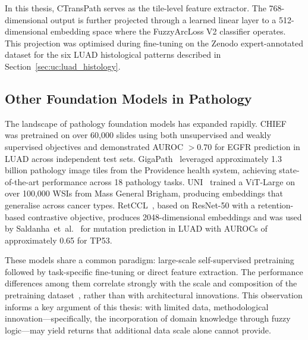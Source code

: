 In this thesis, CTransPath serves as the tile-level feature extractor.
The 768-dimensional output is further projected through a learned linear layer to a 512-dimensional embedding space where the FuzzyArcLoss V2 classifier operates.
This projection was optimised during fine-tuning on the Zenodo expert-annotated dataset for the six LUAD histological patterns described in Section~\ref{sec:uc:luad_histology}.

\subsection{Other Foundation Models in Pathology}
\label{sec:bg:foundation}

The landscape of pathology foundation models has expanded rapidly.
CHIEF~\cite{wang2024chief} was pretrained on over 60,000 slides using both unsupervised and weakly supervised objectives and demonstrated AUROC $>0.70$ for EGFR prediction in LUAD across independent test sets.
GigaPath~\cite{xu2024gigapath} leveraged approximately 1.3 billion pathology image tiles from the Providence health system, achieving state-of-the-art performance across 18 pathology tasks.
UNI~\cite{chen2024uni} trained a ViT-Large on over 100,000 WSIs from Mass General Brigham, producing embeddings that generalise across cancer types.
RetCCL~\cite{wang2023retccl}, based on ResNet-50 with a retention-based contrastive objective, produces 2048-dimensional embeddings and was used by Saldanha~et~al.~\cite{saldanha2023npj} for mutation prediction in LUAD with AUROCs of approximately 0.65 for TP53.

These models share a common paradigm: large-scale self-supervised pretraining followed by task-specific fine-tuning or direct feature extraction.
The performance differences among them correlate strongly with the scale and composition of the pretraining dataset~\cite{foundationbenchmark2025natcomm}, rather than with architectural innovations.
This observation informs a key argument of this thesis: with limited data, methodological innovation---specifically, the incorporation of domain knowledge through fuzzy logic---may yield returns that additional data scale alone cannot provide.

